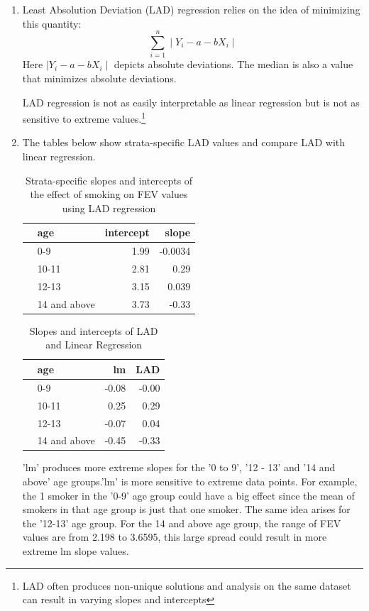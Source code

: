 \documentclass[12pt]{article}
\begin{document}
\begin{enumerate}
\item Least Absolution Deviation (LAD) regression relies on the idea of minimizing this quantity:
\begin{equation}
\sum_{i=1}^{n}\mid Y_{i} - a - bX_{i} \mid
\end{equation}
Here $\mid Y_{i} - a - bX_{i} \mid$ depicts absolute deviations. The median is also a value that minimizes absolute deviations.

LAD regression is not as easily interpretable as linear regression  but is not as sensitive to extreme values.\footnote{\label{1}LAD often produces non-unique solutions and analysis on the same dataset can result in varying slopes and intercepts}

\item The tables below show strata-specific LAD values and compare LAD with linear regression.

\begin{table}[ht]
\centering
\begin{tabular}{rlrr}
  \hline
 & age & intercept & slope \\ 
  \hline
& 0-9 & 1.99 & -0.0034 \\ 
& 10-11 & 2.81 & 0.29 \\ 
& 12-13 & 3.15 & 0.039 \\ 
& 14 and above & 3.73 & -0.33 \\ 
   \hline
\end{tabular}
\caption{Strata-specific slopes and intercepts of the effect of smoking on FEV values using LAD regression}
\end{table}

\begin{table}[ht]
\centering
\begin{tabular}{rlrr}
  \hline
 & age & lm & LAD \\ 
  \hline
& 0-9 & -0.08 & -0.00 \\ 
& 10-11 & 0.25 & 0.29 \\ 
& 12-13 & -0.07 & 0.04 \\ 
& 14 and above & -0.45 & -0.33 \\ 
   \hline
\end{tabular}
\caption{Slopes and intercepts of LAD and Linear Regression}
\end{table}

'lm' produces more extreme slopes for the '0 to 9', '12 - 13' and '14 and above' age groups.'lm' is more sensitive to extreme data points. For example, the 1 smoker in the '0-9' age group could have a big effect since the mean of smokers in that age group is just that one smoker. The same idea arises for the '12-13' age group. For the 14 and above age group, the range of FEV values are from 2.198 to 3.6595, this large spread could result in more extreme lm slope values.
\\[10 pt]
\end{enumerate}
\end{document}
